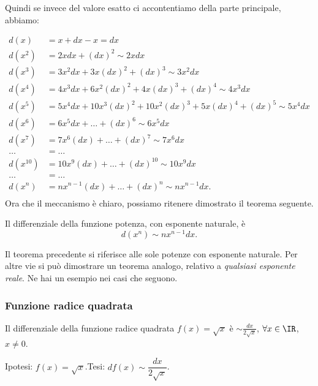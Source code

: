 Quindi se invece del valore esatto ci accontentiamo della parte principale, 
abbiamo:

\begin{align*}
  d(x) &=x+dx-x =dx\\
  d(x^2) &=2xdx +(dx)^2 \sim 2xdx\\
  d(x^3) &=3x^2dx+3x(dx)^2+(dx)^3 \sim 3x^2dx\\
  d(x^4) &=4x^3dx+6x^2(dx)^2+4x(dx)^3+(dx)^4 \sim 4x^3dx\\
  d(x^5) &=5x^4dx+10x^3(dx)^2+10x^2(dx)^3+5x(dx)^4+(dx)^5 \sim 5x^4dx\\
  d(x^6) &=6x^5dx+\dots+(dx)^6 \sim 6x^5dx\\
  d(x^7) &=7x^6(dx)+\dots+(dx)^7 \sim 7x^6dx\\
  \dots &= \dots\\
  d(x^{10}) &=10x^9(dx)+\dots+(dx)^{10} \sim 10x^9dx\\
  \dots &= \dots\\
  d(x^n) &=nx^{n-1}(dx)+\dots+(dx)^{n} \sim nx^{n-1}dx.\\    
\end{align*}
Ora che il meccanismo è chiaro, possiamo ritenere dimostrato il teorema 
seguente.

\begin{teorema}
 Il differenziale della funzione potenza, con esponente naturale, è 
 \[d(x^n) \sim nx^{n-1}dx.\]
\end{teorema}

\begin{osservazione}
Il teorema precedente si riferisce alle sole potenze con esponente
naturale. Per altre vie si può dimostrare un teorema analogo, relativo
a \emph{qualsiasi esponente reale}.
Ne hai un esempio nei casi che seguono.
\end{osservazione}

\subsubsection{Funzione radice quadrata}
\label{subsubsec:diff01_diffradq}

\begin{teorema}
 Il differenziale della funzione radice quadrata $f(x)=\sqrt{x}$ è
 $\sim\frac{dx}{2\sqrt{x}}$, $\forall x\in \IR$, $x\neq 0$.
\end{teorema}

\noindent Ipotesi: \(f(x)=\sqrt{x}\).\tab Tesi: 
\(df(x)\sim\dfrac{dx}{2\sqrt{x}}\).

